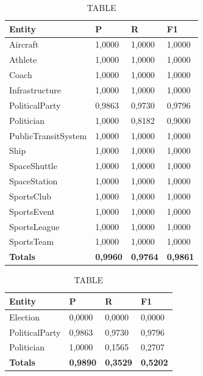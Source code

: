 \documentclass[thesis=M,english]{FITthesis}[2018/05/30]
\begin{document}
	
	\begin{table}[H]\centering
		\caption{TABLE}
		\label{}
		\begin{tabular}{|l|l|l|l|}
			\hline {\textbf{Entity}} & {\textbf{P}} & {\textbf{R}} & {\textbf{F1}}\\\hline
				Aircraft & 1,0000 & 1,0000 & 1,0000\\
				Athlete & 1,0000 & 1,0000 & 1,0000\\
				Coach & 1,0000 & 1,0000 & 1,0000\\
				Infrastructure & 1,0000 & 1,0000 & 1,0000\\
				PoliticalParty & 0,9863 & 0,9730 & 0,9796\\
				Politician & 1,0000 & 0,8182 & 0,9000\\
				PublicTransitSystem & 1,0000 & 1,0000 & 1,0000\\
				Ship & 1,0000 & 1,0000 & 1,0000\\
				SpaceShuttle & 1,0000 & 1,0000 & 1,0000\\
				SpaceStation & 1,0000 & 1,0000 & 1,0000\\ 
				SportsClub & 1,0000 & 1,0000 & 1,0000\\
				SportsEvent & 1,0000 & 1,0000 & 1,0000\\
				SportsLeague & 1,0000 & 1,0000 & 1,0000\\
				SportsTeam & 1,0000 & 1,0000 & 1,0000\\\hline
				\textbf{Totals} & \textbf{0,9960} & \textbf{0,9764} & \textbf{0,9861}\\\hline
		\end{tabular}
	\end{table}

	\begin{table}[H]\centering
		\caption{TABLE}
		\label{}
		\begin{tabular}{|l|l|l|l|}
			\hline {\textbf{Entity}} & {\textbf{P}} & {\textbf{R}} & {\textbf{F1}}\\\hline
				Election & 0,0000 & 0,0000 & 0,0000\\
				PoliticalParty & 0,9863 & 0,9730 & 0,9796\\
				Politician & 1,0000 & 0,1565 & 0,2707\\\hline
				\textbf{Totals} & \textbf{0,9890} & \textbf{0,3529} & \textbf{0,5202}\\\hline
		\end{tabular}
	\end{table}	
\end{document}
